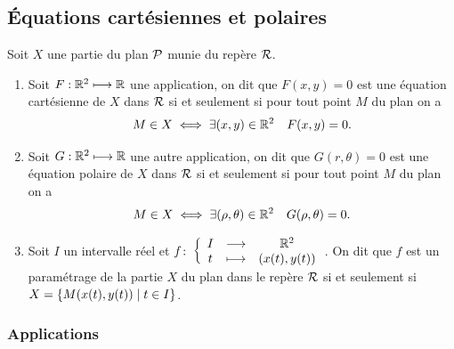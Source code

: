 \subsection{Équations cartésiennes et polaires}
\label{subsec:equationspoletcoordcart}
Soit \(X\) une partie du plan \(\P\) munie du repère \(\Rep\).
\begin{defdef}
  \begin{enumerate}
  \item Soit \(F:\R^2 \longmapsto \R\) une application, on dit que \(F(x,y)=0\) est une équation cartésienne de \(X\) dans \(\Rep\) si et seulement si pour tout point \(M\) du plan on a
    \begin{equation}
      M \in X \iff \exists (x,y)\in\R^2 \quad F(x,y)=0.
    \end{equation}
  \item Soit \(G:\R^2 \longmapsto \R\) une autre application, on dit que \(G(r,\theta)=0\) est une équation polaire de \(X\) dans \(\Rep\) si et seulement si pour tout point \(M\) du plan on a
      \begin{equation}
        M \in X \iff \exists (\rho, \theta)\in\R^2 \quad G(\rho,\theta)=0.
      \end{equation}
  \item Soit \(I\) un intervalle réel et \(\fonction{f}{I}{\R^2}{t}{(x(t),y(t))}\). On dit que \(f\) est un paramétrage de la partie \(X\) du plan dans le repère \(\Rep\) si et seulement si \(X=\enstq{M(x(t),y(t))}{t \in I}\).
  \end{enumerate}
\end{defdef}
%
\subsubsection{Applications}
\label{subsubsec:applicationeqcartetpol}
